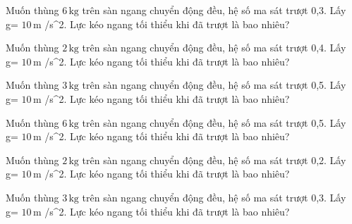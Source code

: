 \begin{ex}
Muốn thùng $6\,\text{kg}$ trên sàn ngang chuyển động đều, hệ số ma sát trượt 0,3. Lấy g= $10\,\text{m}$ /s^2. Lực kéo ngang tối thiểu khi đã trượt là bao nhiêu?
\end{ex}

\begin{ex}
Muốn thùng $2\,\text{kg}$ trên sàn ngang chuyển động đều, hệ số ma sát trượt 0,4. Lấy g= $10\,\text{m}$ /s^2. Lực kéo ngang tối thiểu khi đã trượt là bao nhiêu?
\end{ex}

\begin{ex}
Muốn thùng $3\,\text{kg}$ trên sàn ngang chuyển động đều, hệ số ma sát trượt 0,5. Lấy g= $10\,\text{m}$ /s^2. Lực kéo ngang tối thiểu khi đã trượt là bao nhiêu?
\end{ex}

\begin{bt}
Muốn thùng $6\,\text{kg}$ trên sàn ngang chuyển động đều, hệ số ma sát trượt 0,5. Lấy g= $10\,\text{m}$ /s^2. Lực kéo ngang tối thiểu khi đã trượt là bao nhiêu?
\end{bt}

\begin{bt}
Muốn thùng $2\,\text{kg}$ trên sàn ngang chuyển động đều, hệ số ma sát trượt 0,2. Lấy g= $10\,\text{m}$ /s^2. Lực kéo ngang tối thiểu khi đã trượt là bao nhiêu?
\end{bt}

\begin{bt}
Muốn thùng $3\,\text{kg}$ trên sàn ngang chuyển động đều, hệ số ma sát trượt 0,3. Lấy g= $10\,\text{m}$ /s^2. Lực kéo ngang tối thiểu khi đã trượt là bao nhiêu?
\end{bt}

